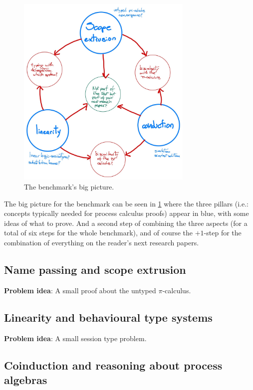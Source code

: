 \documentclass{jfp}
\begin{document}
\begin{figure}[h]
  \centering
  \includegraphics[width=0.75\textwidth]{images/benchmark.jpeg}
  \caption{The benchmark's big picture.}
  \label{fig:bigpic}
\end{figure}

The big picture for the benchmark can be seen in \cref{fig:bigpic}
where the three pillars (i.e.: concepts typically needed for process
calculus proofs) appear in blue, with some ideas of what to prove. And
a second step of combining the three aspects (for a total of six steps
for the whole benchmark), and of course the $+1$-step for the
combination of everything on the reader's next research papers.

\subsection{Name passing and scope extrusion}

\textbf{Problem idea}: A small proof about the untyped $\pi$-calculus.

\subsection{Linearity and behavioural type systems}

\textbf{Problem idea}: A small session type problem.

\subsection{Coinduction and reasoning about process algebras}
\end{document}
